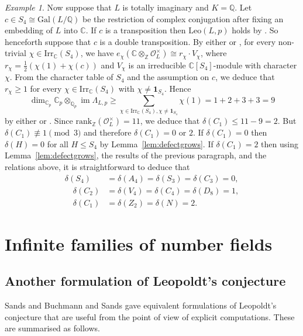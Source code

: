 \documentclass[12pt]{amsart}
\theoremstyle{plain}
\theoremstyle{remark}
\newtheorem{example}[theorem]{Example}
\theoremstyle{definition}
\newcommand{\Z}{\mathbb{Z}}
\newcommand{\Q}{\mathbb{Q}}
\newcommand{\C}{\mathbb{C}}
\newcommand{\Gal}{\mathrm{Gal}}
\newcommand{\rank}{\mathrm{rank}}
\newcommand{\Irr}{\mathrm{Irr}}
\newcommand{\Leo}{\mathrm{Leo}}
\DeclareMathOperator{\image}{im}
\numberwithin{equation}{section}
\begin{document}
\begin{example}
Now suppose that $L$ is totally imaginary and $K=\Q$. 
Let $c \in S_{4} \cong \Gal(L/\Q)$ be the restriction of complex conjugation after fixing an embedding of $L$ into $\C$.
If $c$ is a transposition then $\Leo(L,p)$ holds by \cite[Théorème 5]{MR1004134}.
So henceforth suppose that $c$ is a double transposition.
By either \cite[II.2]{MR769790} or \cite[1.3]{MR1004134},
for every non-trivial $\chi \in \Irr_{\C}(S_{4})$, 
we have $e_{\chi}(\C \otimes_{\Z} \mathcal{O}_{L}^{\times}) \cong r_{\chi} \cdot V_{\chi}$,
where $r_{\chi} = \frac{1}{2}(\chi(1) + \chi(c))$ and
$V_{\chi}$ is an irreducible $\C[S_{4}]$-module with character $\chi$.
From the character table of $S_{4}$ and the assumption on $c$,
we deduce that $r_{\chi} \geq 1$ for every $\chi \in \Irr_{\C}(S_{4})$ with $\chi \neq \mathbf{1}_{S_{4}}$.
Hence
\[
\textstyle{
\dim_{\C_{p}} \C_{p} \otimes_{\Q_{p}} \image \Lambda_{L,p} \geq \sum_{\chi \in \Irr_{\C}(S_{4}), \chi \neq \mathbf{1}_{S_{4}}} \chi(1) = 1 + 2 + 3 + 3 = 9}
\]
by either \cite[Th\'eor\`eme~1]{MR769790} or \cite[Corollaire~1]{MR1004134}.
Since $\rank_{\Z}(\mathcal{O}_{L}^{\times})=11$, we deduce that $\delta(C_{1}) \leq 11-9=2$.
But $\delta(C_{1}) \not \equiv 1 \pmod 3$ and therefore $\delta(C_{1})=0$ or $2$.  
If $\delta(C_{1})=0$ then $\delta(H)=0$ for all $H \leq S_{4}$ by Lemma~\ref{lem:defectgrows}.
If $\delta(C_{1})=2$ then using Lemma~\ref{lem:defectgrows}, the results of the previous paragraph, and the relations above, it is straightforward to deduce that
\begin{align*}
\delta(S_{4})&=\delta(A_{4})=\delta(S_{3})=\delta(C_{3})=0, \\
\quad \delta(C_{2})&=\delta(V_{4})=\delta(C_{4})=\delta(D_{8})=1,\\
\quad \delta(C_{1})&=\delta(Z_{2})=\delta(N)=2.
\end{align*}
\end{example}


\section{Infinite families of number fields}\label{sec:infinite}

\subsection{Another formulation of Leopoldt's conjecture}
Sands \cite{MR956366} and Buchmann and Sands \cite{MR904010,MR958040} gave equivalent formulations of Leopoldt's conjecture that are useful from the point of view of explicit computations.
These are summarised as follows.
\end{document}
